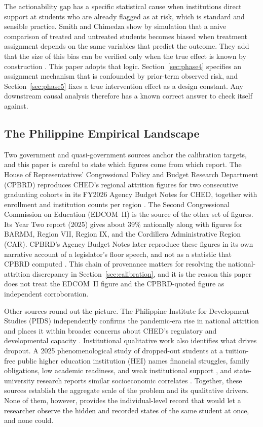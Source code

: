 \documentclass[11pt]{article}
\begin{document}
\hspace*{\parindent}The actionability gap has a specific statistical cause when institutions direct support at students who are already flagged as at risk, which is standard and sensible practice. Smith and Chimedza show by simulation that a naive comparison of treated and untreated students becomes biased when treatment assignment depends on the same variables that predict the outcome. They add that the size of this bias can be verified only when the true effect is known by construction \citep{smith2021}. This paper adopts that logic. Section~\ref{sec:phase4} specifies an assignment mechanism that is confounded by prior-term observed risk, and Section~\ref{sec:phase5} fixes a true intervention effect as a design constant. Any downstream causal analysis therefore has a known correct answer to check itself against.

\subsection{The Philippine Empirical Landscape}
\label{sec:related-D}

\hspace*{\parindent}Two government and quasi-government sources anchor the calibration targets, and this paper is careful to state which figures come from which report. The House of Representatives' Congressional Policy and Budget Research Department (CPBRD) reproduces CHED's regional attrition figures for two consecutive graduating cohorts in its FY2026 Agency Budget Notes for CHED, together with enrollment and institution counts per region \citep{cpbrd2026}. The Second Congressional Commission on Education (EDCOM~II) is the source of the other set of figures. Its Year Two report (2025) gives about 39\% nationally along with figures for BARMM, Region VII, Region IX, and the Cordillera Administrative Region (CAR). CPBRD's Agency Budget Notes later reproduce these figures in its own narrative account of a legislator's floor speech, and not as a statistic that CPBRD computed \citep{edcom2025y2}. This chain of provenance matters for resolving the national-attrition discrepancy in Section~\ref{sec:calibration}, and it is the reason this paper does not treat the EDCOM~II figure and the CPBRD-quoted figure as independent corroboration.

Other sources round out the picture. The Philippine Institute for Development Studies (PIDS) independently confirms the pandemic-era rise in national attrition and places it within broader concerns about CHED's regulatory and developmental capacity \citep{pids2024}. Institutional qualitative work also identifies what drives dropout. A 2025 phenomenological study of dropped-out students at a tuition-free public higher education institution (HEI) names financial struggles, family obligations, low academic readiness, and weak institutional support \citep{cahilog2025}, and state-university research reports similar socioeconomic correlates \citep{socioeconomic2024}. Together, these sources establish the aggregate scale of the problem and its qualitative drivers. None of them, however, provides the individual-level record that would let a researcher observe the hidden and recorded states of the same student at once, and none could.
\end{document}
